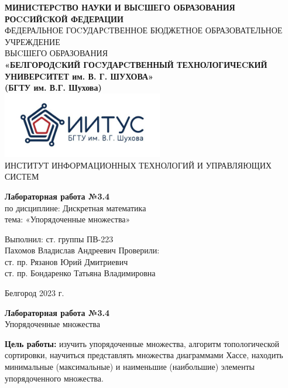 \documentclass[a4paper,14pt]{extarticle}
\newcommand\textbox[1]{
	\parbox{.45\textwidth}{#1}
}
\begin{document}
\begin{center}
	\small{
		\textbf{МИНИCТЕРCТВО НАУКИ И ВЫCШЕГО ОБРАЗОВАНИЯ РОCCИЙCКОЙ ФЕДЕРАЦИИ}\\
		ФЕДЕРАЛЬНОЕ ГОCУДАРCТВЕННОЕ БЮДЖЕТНОЕ ОБРАЗОВАТЕЛЬНОЕ УЧРЕЖДЕНИЕ\\ВЫCШЕГО ОБРАЗОВАНИЯ \\
		\textbf{«БЕЛГОРОДCКИЙ ГОCУДАРCТВЕННЫЙ ТЕХНОЛОГИЧЕCКИЙ\\УНИВЕРCИТЕТ им. В. Г. ШУХОВА»\\ (БГТУ им. В.Г. Шухова)} \\
		\bigbreak
		\includegraphics[width=70mm]{log}\\
		ИНСТИТУТ ИНФОРМАЦИОННЫХ ТЕХНОЛОГИЙ И УПРАВЛЯЮЩИХ СИСТЕМ\\}
\end{center}

\vfill
\begin{center}
	\large{
		\textbf{
			Лабораторная работа №3.4}}\\
	\normalsize{
		по дисциплине: Дискретная математика \\
		тема: «Упорядоченные множества»}
\end{center}
\vfill
\hfill\textbox{
	Выполнил: ст. группы ПВ-223\\Пахомов Владислав Андреевич
	\bigbreak
	Проверили: \\ст. пр. Рязанов Юрий Дмитриевич\\
	ст. пр. Бондаренко Татьяна Владимировна
}
\vfill\begin{center}
	Белгород 2023 г.
\end{center}
\newpage
\begin{center}
	\textbf{Лабораторная работа №3.4}\\
	Упорядоченные множества
\end{center}
\textbf{Цель работы: }изучить упорядоченные множества, алгоритм 
топологической сортировки, научиться представлять 
множества диаграммами Хассе, находить минимальные
(максимальные) и наименьшие (наибольшие) элементы 
упорядоченного множества.
\end{document}
